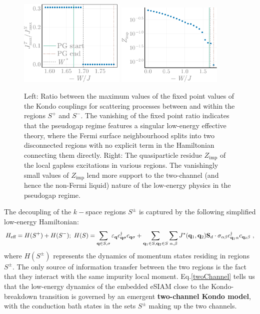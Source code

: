 \documentclass[reprint,hidelinks,onecolumn]{revtex4-2}
\begin{document}
\begin{figure}[htpb]
	\centering
	\includegraphics[width=0.45\textwidth]{quadrantMaxKondo-49.pdf}
	\includegraphics[width=0.45\textwidth]{localQPResidue.pdf}
	\caption{Left: Ratio between the maximum values of the fixed point values of the Kondo couplings for scattering processes between and within the regions \(S^+\) and \(S^-\). The vanishing of the fixed point ratio indicates that the pseudogap regime features a singular low-energy effective theory, where the Fermi surface neighbourhood splits into two disconnected regions with no explicit term in the Hamiltonian connecting them directly. Right: The quasiparticle residue \(Z_\text{imp}\) of the local gapless excitations in various regions. The vanishingly small values of \(Z_\text{imp}\) lend more support to the two-channel (and hence the non-Fermi liquid) nature of the low-energy physics in the pseudogap regime.}
	\label{channelDecoupling}
\end{figure}

The decoupling of the \(k-\)space regions \(S^\pm\) is captured by the following simplified low-energy Hamiltonian:
\begin{equation}\begin{aligned}\label{twoChannel}
H_\text{eff} = H(S^+) + H(S^-);~H(S) = \sum_{{\bf q}\in S,\sigma}\varepsilon_{\bf q}c^\dagger_{{\bf q}\sigma}c_{{\bf q}\sigma} + \sum_{{\bf q}_1\in S,{\bf q}_2\in S}\sum_{\alpha,\beta}J^*({\bf q}_1,{\bf q}_2){\bf S}_d\cdot {\bf \sigma}_{\alpha\beta}c^\dagger_{{\bf q}_1\alpha}c_{{\bf q}_2\beta}~,
\end{aligned}\end{equation}
where \(H(S^\pm)\) represents the dynamics of momentum states residing in regions \(S^\pm\). The only source of information transfer between the two regions is the fact that they interact with the same impurity local moment. Eq.\ref{twoChannel} tells us that the low-energy dynamics of the embedded eSIAM close to the Kondo-breakdown transition is governed by an emergent {\bf two-channel Kondo model}, with the conduction bath states in the sets \(S^\pm\) making up the two channels.
\end{document}
